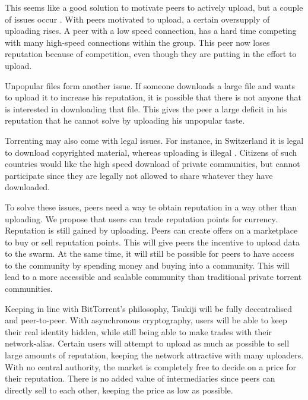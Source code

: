 This seems like a good solution to motivate peers to actively upload, but a couple of issues occur \cite{bartercast}.
With peers motivated to upload, a certain oversupply of uploading rises.
A peer with a low speed connection, has a hard time competing with many high-speed connections within the group.
This peer now loses reputation because of competition, even though they are putting in the effort to upload.

Unpopular files form another issue.
If someone downloads a large file and wants to upload it to increase his reputation, it is possible that there is not anyone that is interested in downloading that file.
This gives the peer a large deficit in his reputation that he cannot solve by uploading his unpopular taste.

Torrenting may also come with legal issues.
For instance, in Switzerland it is legal to download copyrighted material, whereas uploading is illegal \cite{switzerland}\cite{switzerland2}.
Citizens of such countries would like the high speed download of private communities, but cannot participate since they are legally not allowed to share whatever they have downloaded.

To solve these issues, peers need a way te obtain reputation in a way other than uploading.
We propose that users can trade reputation points for currency.
Reputation is still gained by uploading.
Peers can create offers on a marketplace to buy or sell reputation points.
This will give peers the incentive to upload data to the swarm.
At the same time, it will still be possible for peers to have access to the community by spending money and buying into a community.
This will lead to a more accessible and scalable community than traditional private torrent communities.

Keeping in line with BitTorrent's philosophy, Tsukiji will be fully decentralised and peer-to-peer.
With asynchronous cryptography, users will be able to keep their real identity hidden, while still being able to make trades with their network-alias.
Certain users will attempt to upload as much as possible to sell large amounts of reputation, keeping the network attractive with many uploaders.
With no central authority, the market is completely free to decide on a price for their reputation.
There is no added value of intermediaries since peers can directly sell to each other, keeping the price as low as possible.


